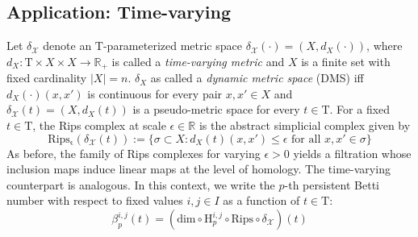 \documentclass[10pt]{article}
\begin{document}
\subsection{Application: Time-varying }
Let $\delta_\mathcal{X}$ denote an $\mathrm{T}$-parameterized metric space $\delta_\mathcal{X}(\cdot) = ( X, d_X(\cdot) )$, where $d_X: \mathrm{T} \times X \times X \to \mathbb{R}_+$ is called a \emph{time-varying metric}  and $X$ is a finite set with fixed cardinality $\lvert X \rvert = n$. $\delta_X$ as called a \emph{dynamic metric space} (DMS) iff $d_X(\cdot)(x, x')$ is continuous for every pair $x, x' \in X$ and $\delta_\mathcal{X}(t) = (X, d_X(t))$ is a pseudo-metric space for every $t \in \mathrm{T}$. 
For a fixed $t \in \mathrm{T}$, the Rips complex at scale $\epsilon \in \mathbb{R}$ is the abstract simplicial complex given by 
\begin{equation}
	\mathrm{Rips_{\epsilon}}(\delta_\mathcal{X}(t)) := \{ \sigma \subset X : d_X(t)(x, x') \leq \epsilon \text{ for all } x, x' \in \sigma \}
\end{equation}
\noindent As before, the family of Rips complexes for varying $\epsilon > 0$ yields a filtration whose inclusion maps induce linear maps at the level of homology. The time-varying counterpart is analogous.  
In this context, we write the $p$-th persistent Betti number with respect to fixed values $i,j \in I$ as a function of $t \in \mathrm{T}$: 
\begin{equation}
\beta_{p}^{i,j}(t) = \left(\mathrm{dim} \circ \mathrm{H}_p^{i,j} \circ \mathrm{Rips} \circ \delta_\mathcal{X} \right)(t)
\end{equation}
\end{document}
